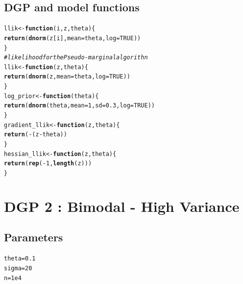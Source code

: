 \documentclass[11pt,a4paper]{report}\usepackage[]{graphicx}\usepackage[]{color}
\makeatletter
\newcommand{\hlnum}[1]{\textcolor[rgb]{0.686,0.059,0.569}{#1}}%
\newcommand{\hlcom}[1]{\textcolor[rgb]{0.678,0.584,0.686}{\textit{#1}}}%
\newcommand{\hlopt}[1]{\textcolor[rgb]{0,0,0}{#1}}%
\newcommand{\hlstd}[1]{\textcolor[rgb]{0.345,0.345,0.345}{#1}}%
\newcommand{\hlkwa}[1]{\textcolor[rgb]{0.161,0.373,0.58}{\textbf{#1}}}%
\newcommand{\hlkwb}[1]{\textcolor[rgb]{0.69,0.353,0.396}{#1}}%
\newcommand{\hlkwc}[1]{\textcolor[rgb]{0.333,0.667,0.333}{#1}}%
\newcommand{\hlkwd}[1]{\textcolor[rgb]{0.737,0.353,0.396}{\textbf{#1}}}%
\newenvironment{kframe}{%
 \def\at@end@of@kframe{}%
 \ifinner\ifhmode%
  \def\at@end@of@kframe{\end{minipage}}%
  \begin{minipage}{\columnwidth}%
 \fi\fi%
 \def\FrameCommand##1{\hskip\@totalleftmargin \hskip-\fboxsep
 \colorbox{shadecolor}{##1}\hskip-\fboxsep
     \hskip-\linewidth \hskip-\@totalleftmargin \hskip\columnwidth}%
 \MakeFramed {\advance\hsize-\width
   \@totalleftmargin\z@ \linewidth\hsize
   \@setminipage}}%
 {\par\unskip\endMakeFramed%
 \at@end@of@kframe}
\newenvironment{knitrout}{}{} %
\makeatother
\begin{document}
\begin{appendix}
\subsection{DGP and model functions}
\begin{knitrout}
\color{fgcolor}\begin{kframe}
\begin{alltt}
\hlstd{llik}\hlkwb{<-}\hlkwa{function} \hlstd{(}\hlkwc{i}\hlstd{,}\hlkwc{z}\hlstd{,}\hlkwc{theta}\hlstd{) \{}
  \hlkwd{return}\hlstd{(}\hlkwd{dnorm}\hlstd{(z[i],}\hlkwc{mean}\hlstd{=theta,} \hlkwc{log}\hlstd{=}\hlnum{TRUE}\hlstd{))}
\hlstd{\}}
\hlcom{#likelihood for the Pseudo-marginal algorithn}
\hlstd{llik}\hlkwb{<-}\hlkwa{function} \hlstd{(}\hlkwc{z}\hlstd{,}\hlkwc{theta}\hlstd{) \{}
  \hlkwd{return}\hlstd{(}\hlkwd{dnorm}\hlstd{(z,}\hlkwc{mean}\hlstd{=theta,} \hlkwc{log}\hlstd{=}\hlnum{TRUE}\hlstd{))}
\hlstd{\}}
\hlstd{log_prior}\hlkwb{<-}\hlkwa{function}\hlstd{(}\hlkwc{theta}\hlstd{) \{}
  \hlkwd{return}\hlstd{(}\hlkwd{dnorm}\hlstd{(theta,}\hlkwc{mean}\hlstd{=}\hlnum{1}\hlstd{,} \hlkwc{sd}\hlstd{=}\hlnum{0.3}\hlstd{,}\hlkwc{log}\hlstd{=}\hlnum{TRUE}\hlstd{))}
\hlstd{\}}
\hlstd{gradient_llik}\hlkwb{<-}\hlkwa{function}\hlstd{(}\hlkwc{z}\hlstd{,}\hlkwc{theta}\hlstd{) \{}
  \hlkwd{return}\hlstd{(}\hlopt{-}\hlstd{(z}\hlopt{-}\hlstd{theta))}
\hlstd{\}}
\hlstd{hessian_llik}\hlkwb{<-}\hlkwa{function}\hlstd{(}\hlkwc{z}\hlstd{,}\hlkwc{theta}\hlstd{) \{}
  \hlkwd{return}\hlstd{(}\hlkwd{rep}\hlstd{(}\hlopt{-}\hlnum{1}\hlstd{,}\hlkwd{length}\hlstd{(z)))}
\hlstd{\}}
\end{alltt}
\end{kframe}
\end{knitrout}

\section {DGP 2 : Bimodal - High Variance}
\subsection{Parameters}
\begin{knitrout}
\color{fgcolor}\begin{kframe}
\begin{alltt}
\hlstd{theta}\hlkwb{=}\hlnum{0.1}
\hlstd{sigma}\hlkwb{=}\hlnum{20}
\hlstd{n}\hlkwb{=}\hlnum{1e4}
\end{alltt}
\end{kframe}
\end{knitrout}

\end{appendix}
\end{document}
